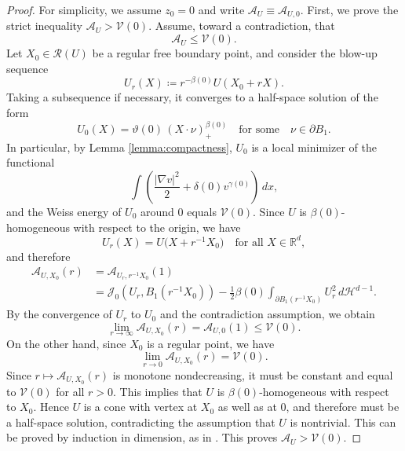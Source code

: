 \documentclass[reqno,11pt]{amsart}
\newcommand{\1}{\mathds{1}}  %
\numberwithin{equation}{section}
\begin{document}
\begin{proof}
For simplicity, we assume $z_0 = 0$ and write $\mathcal{A}_{U} \equiv \mathcal{A}_{U,0}$. First, we prove the strict inequality $\mathcal{A}_{U}>\mathcal{V}(0)$.
Assume, toward a contradiction, that
\[
    \mathcal{A}_{U}\le \mathcal{V}(0).
\]
Let $X_0 \in \mathcal{R}(U)$ be a regular free boundary point, and consider the blow-up sequence
\[
    U_r(X)\coloneqq r^{-\beta(0)}U(X_0+rX).
\]
Taking a subsequence if necessary, it converges to a half-space solution of the form
\[
    U_0(X) = \vartheta(0)\,(X\cdot \nu)_+^{\beta(0)} \quad \text{for some} \quad \nu \in \partial B_1.
\]
In particular, by Lemma \ref{lemma:compactness}, $U_0$ is a local minimizer of the functional
\begin{equation}\label{eq:func-at-0}
	\int \left(\frac{|\nabla v|^2}{2} + \delta(0) v^{\gamma(0)} \right)\,dx,
\end{equation}
and the Weiss energy of $U_0$ around $0$ equals $\mathcal{V}(0)$. Since $U$ is $\beta(0)$-homogeneous with respect to the origin, we have
\[
    U_r(X)=U\bigl(X+r^{-1}X_0\bigr)\quad \text{for all }X\in \mathbb{R}^d,
\]
and therefore 
\begin{align*}
	\mathcal{A}_{U,X_0}(r) & = \mathcal{A}_{U_r,r^{-1}X_0}(1)\\
	& = \mathcal{J}_{0}(U_r,B_1(r^{-1}X_0)) - \frac{1}{2}\beta(0)\int_{\partial B_1(r^{-1}X_0)}U_r^2\, d\mathcal{H}^{d-1}.
\end{align*}
By the convergence of $U_r$ to $U_0$ and the contradiction assumption, we obtain
\[
	\lim_{r \to \infty}\mathcal{A}_{U,X_0}(r) = \mathcal{A}_{U,0}(1) \leq \mathcal{V}(0).
\]
On the other hand, since $X_0$ is a regular point, we have
\[
    \lim_{r\to 0}\mathcal{A}_{U,X_0}(r) = \mathcal{V}(0).
\]
Since $r\mapsto \mathcal{A}_{U,X_0}(r)$ is monotone nondecreasing, it must be constant and equal to $\mathcal{V}(0)$ for all $r>0$. This implies that $U$ is $\beta(0)$-homogeneous with respect to $X_0$. 
Hence $U$ is a cone with vertex at $X_0$ as well as at $0$, and therefore must be a half-space solution, contradicting the assumption that $U$ is nontrivial. This can be proved by induction in dimension, as in \cite[Proof of Proposition~8.1]{W3}. This proves $\mathcal{A}_{U}>\mathcal{V}(0)$.


\end{proof}
\end{document}

